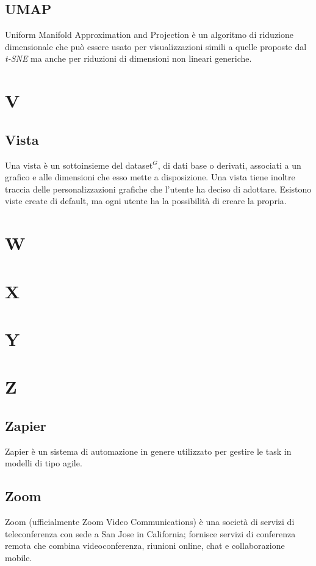 \subsection{UMAP}
Uniform Manifold Approximation and Projection è un algoritmo di riduzione dimensionale che può essere usato per visualizzazioni simili a quelle proposte dal \textit{t-SNE} ma anche per  riduzioni di dimensioni non lineari generiche.

\newpage
\section{V}
\subsection{Vista}
Una vista è un sottoinsieme del dataset$^{G}$, di dati base o derivati, associati a un grafico e alle dimensioni che esso mette a disposizione. Una vista tiene inoltre traccia delle personalizzazioni grafiche che l'utente ha deciso di adottare. Esistono viste create di default, ma ogni utente ha la possibilità di creare la propria.

\newpage
\section{W}

\newpage
\section{X}

\newpage
\section{Y}

\newpage
\section{Z}
\subsection{Zapier}
Zapier è un sistema di automazione in genere utilizzato per gestire le task in modelli di tipo agile.

\subsection{Zoom}
Zoom (ufficialmente Zoom Video Communications) è una società di servizi di teleconferenza con sede a San Jose in California; fornisce servizi di conferenza remota che combina videoconferenza, riunioni online, chat e collaborazione mobile.